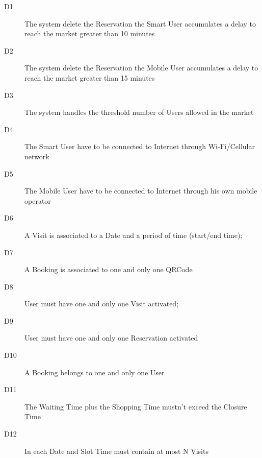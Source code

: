 \begin{description}
    \item[D1] The system delete the Reservation the Smart User accumulates a delay to reach the market greater than 10 minutes
    \item[D2] The system delete the Reservation the Mobile User accumulates a delay to reach the market greater than 15 minutes
    \item[D3] The system handles the threshold number of Users allowed in the market
    \item[D4] The Smart User have to be connected to Internet through Wi-Fi/Cellular network
    \item[D5] The Mobile User have to be connected to Internet through his own mobile operator
    \item[D6] A Visit is associated to a Date and a period of time (start/end time);
    \item[D7] A Booking is associated to one and only one QRCode
    \item[D8] User must have one and only one Visit activated;
    \item[D9] User must have one and only one Reservation activated
    \item[D10] A Booking belongs to one and only one User
    \item[D11] The Waiting Time plus the Shopping Time mustn’t exceed the Closure Time
    \item[D12] In each Date and Slot Time must contain at most N Visits
\end{description}

 


